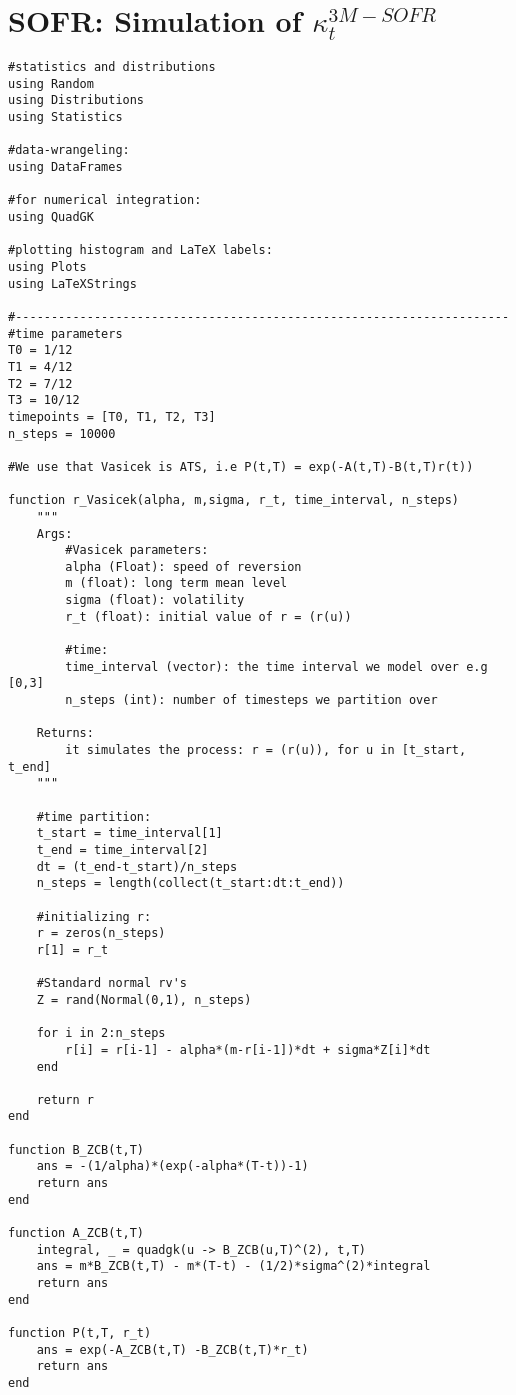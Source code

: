 \newpage 
\section{SOFR: Simulation of $\kappa_{t}^{3M-SOFR}$}
\begin{verbatim}
#statistics and distributions
using Random 
using Distributions
using Statistics

#data-wrangeling:
using DataFrames

#for numerical integration:
using QuadGK

#plotting histogram and LaTeX labels:
using Plots 
using LaTeXStrings

#---------------------------------------------------------------------
#time parameters
T0 = 1/12
T1 = 4/12
T2 = 7/12
T3 = 10/12
timepoints = [T0, T1, T2, T3]
n_steps = 10000

#We use that Vasicek is ATS, i.e P(t,T) = exp(-A(t,T)-B(t,T)r(t))

function r_Vasicek(alpha, m,sigma, r_t, time_interval, n_steps)
    """
    Args: 
        #Vasicek parameters:
        alpha (Float): speed of reversion 
        m (float): long term mean level 
        sigma (float): volatility 
        r_t (float): initial value of r = (r(u))
        
        #time:
        time_interval (vector): the time interval we model over e.g [0,3]
        n_steps (int): number of timesteps we partition over
    
    Returns: 
        it simulates the process: r = (r(u)), for u in [t_start, t_end]
    """

    #time partition: 
    t_start = time_interval[1]
    t_end = time_interval[2]
    dt = (t_end-t_start)/n_steps
    n_steps = length(collect(t_start:dt:t_end))

    #initializing r: 
    r = zeros(n_steps)
    r[1] = r_t

    #Standard normal rv's
    Z = rand(Normal(0,1), n_steps)

    for i in 2:n_steps
        r[i] = r[i-1] - alpha*(m-r[i-1])*dt + sigma*Z[i]*dt
    end

    return r
end

function B_ZCB(t,T)
    ans = -(1/alpha)*(exp(-alpha*(T-t))-1)
    return ans
end

function A_ZCB(t,T)
    integral, _ = quadgk(u -> B_ZCB(u,T)^(2), t,T)
    ans = m*B_ZCB(t,T) - m*(T-t) - (1/2)*sigma^(2)*integral 
    return ans
end

function P(t,T, r_t)
    ans = exp(-A_ZCB(t,T) -B_ZCB(t,T)*r_t)
    return ans
end


\end{verbatim}
